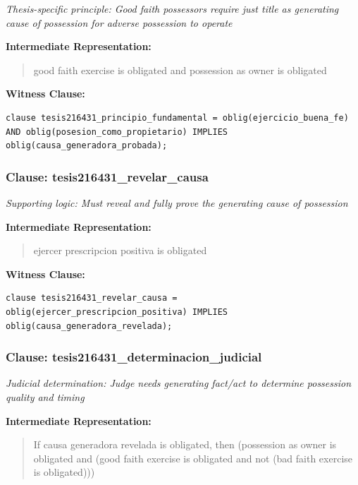 \documentclass[11pt,a4paper]{article}
\begin{document}
\textit{Thesis-specific principle: Good faith possessors require just title as generating cause of possession for adverse possession to operate}

\textbf{Intermediate Representation:}

\begin{quote}
good faith exercise is obligated and possession as owner is obligated
\end{quote}

\textbf{Witness Clause:}

\begin{lstlisting}[style=witnessstyle, language=Witness]
clause tesis216431_principio_fundamental = oblig(ejercicio_buena_fe) AND oblig(posesion_como_propietario) IMPLIES oblig(causa_generadora_probada);
\end{lstlisting}

\subsubsection{Clause: tesis216431\_revelar\_causa}

\textit{Supporting logic: Must reveal and fully prove the generating cause of possession}

\textbf{Intermediate Representation:}

\begin{quote}
ejercer prescripcion positiva is obligated
\end{quote}

\textbf{Witness Clause:}

\begin{lstlisting}[style=witnessstyle, language=Witness]
clause tesis216431_revelar_causa = oblig(ejercer_prescripcion_positiva) IMPLIES oblig(causa_generadora_revelada);
\end{lstlisting}

\subsubsection{Clause: tesis216431\_determinacion\_judicial}

\textit{Judicial determination: Judge needs generating fact/act to determine possession quality and timing}

\textbf{Intermediate Representation:}

\begin{quote}
If causa generadora revelada is obligated, then (possession as owner is obligated and (good faith exercise is obligated and not (bad faith exercise is obligated)))
\end{quote}
\end{document}
